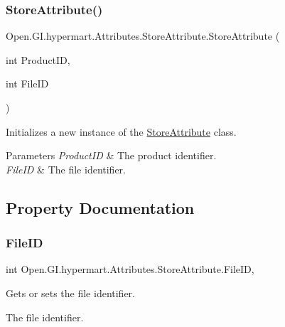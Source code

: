 \subsubsection{\texorpdfstring{Store\+Attribute()}{StoreAttribute()}}
{\footnotesize\ttfamily Open.\+G\+I.\+hypermart.\+Attributes.\+Store\+Attribute.\+Store\+Attribute (\begin{DoxyParamCaption}\item[{int}]{Product\+ID,  }\item[{int}]{File\+ID }\end{DoxyParamCaption})}



Initializes a new instance of the \hyperlink{class_open_1_1_g_i_1_1hypermart_1_1_attributes_1_1_store_attribute}{Store\+Attribute} class. 


\begin{DoxyParams}{Parameters}
{\em Product\+ID} & The product identifier.\\
\hline
{\em File\+ID} & The file identifier.\\
\hline
\end{DoxyParams}


\subsection{Property Documentation}
\hypertarget{class_open_1_1_g_i_1_1hypermart_1_1_attributes_1_1_store_attribute_aa321f5e2ab58ed219e952f1e8036fcfa}{}\label{class_open_1_1_g_i_1_1hypermart_1_1_attributes_1_1_store_attribute_aa321f5e2ab58ed219e952f1e8036fcfa} 
\subsubsection{\texorpdfstring{File\+ID}{FileID}}
{\footnotesize\ttfamily int Open.\+G\+I.\+hypermart.\+Attributes.\+Store\+Attribute.\+File\+ID\hspace{0.3cm}{\ttfamily [get]}, {\ttfamily [set]}}



Gets or sets the file identifier. 

The file identifier. \hypertarget{class_open_1_1_g_i_1_1hypermart_1_1_attributes_1_1_store_attribute_acf647c6eece8333d1d8d817474d5776d}{}\label{class_open_1_1_g_i_1_1hypermart_1_1_attributes_1_1_store_attribute_acf647c6eece8333d1d8d817474d5776d} 
